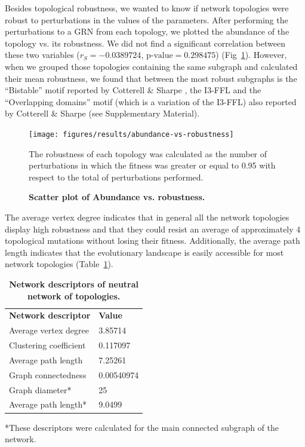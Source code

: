 \documentclass[10pt,letterpaper]{article}
\newlength\savedwidth
\newcommand\thickhline{\noalign{\global\savedwidth\arrayrulewidth\global\arrayrulewidth 2pt}%
\hline
\noalign{\global\arrayrulewidth\savedwidth}}
\begin{document}
Besides topological robustness, we wanted to know if network topologies were
robust to perturbations in the values of the parameters. After performing the
perturbations to a GRN from each topology, we plotted the abundance of the
topology vs. its robustness. We did not find a significant correlation between
these two variables ($r_S = −0.0389724$, $\text{p-value} = 0.298475$) 
(Fig~\ref{fig:ab-rob}). However, when we grouped those topologies containing 
the same subgraph and calculated their mean robustness, we found that between 
the most robust subgraphs is the ``Bistable'' motif reported by Cotterell \& 
Sharpe \cite{Cotterell2010}, the I3-FFL and the ``Overlapping domains'' motif 
(which is a variation of the I3-FFL) also reported by Cotterell \& Sharpe (see 
Supplementary Material).

\begin{figure}[!h]
 \texttt{[image: figures/results/abundance-vs-robustness]}
 \caption{\bf Scatter plot of Abundance vs. robustness.}
 The robustness of each topology was calculated as the number of perturbations
 in which the fitness was greater or equal to 0.95 with respect to the total of
 perturbations performed.
 \label{fig:ab-rob}
\end{figure}

The average vertex degree indicates that in general all the network topologies
display high robustness and that they could resist an average of approximately 4
topological mutations without losing their fitness. Additionally, the average
path length indicates that the evolutionary landscape is easily accessible for
most network topologies (Table~\ref{table1}).

\begin{table}[!ht]
 \centering
 \caption{{\bf Network descriptors of neutral network of topologies.}}
 \begin{tabular}{|l|l|}
 \hline
 {\bf Network descriptor} & {\bf Value}\\ \thickhline
 Average vertex degree  & 3.85714 \\ \hline
 Clustering coefficient \cite{Watts1998} & 0.117097 \\ \hline
 Average path length    & 7.25261       \\ \hline
 Graph connectedness    & 0.00540974    \\ \hline
 Graph diameter*        & 25            \\ \hline
 Average path length*   & 9.0499        \\ \hline
 \end{tabular}
 \begin{flushleft} *These descriptors were calculated for the main connected
 subgraph of the network.
 \end{flushleft}
 \label{table1}
 \end{table}
\end{document}
